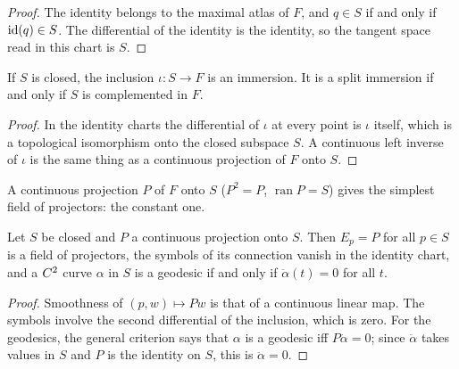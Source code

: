 \begin{proof}
  \leanok
  The identity belongs to the maximal atlas of $F$, and $q \in S$ if and only if
  $\mathrm{id}(q) \in S$. The differential of the identity is the identity, so the tangent space read
  in this chart is $S$.
\end{proof}

\begin{proposition}
  \label{prop:ex-subspace-immersion}
  \leanok
  If $S$ is closed, the inclusion $\iota \colon S \to F$ is an immersion. It is a split
  immersion if and only if $S$ is complemented in $F$.
\end{proposition}

\begin{proof}
  \leanok
  In the identity charts the differential of $\iota$ at every point is $\iota$ itself, which is
  a topological isomorphism onto the closed subspace $S$. A continuous left inverse of $\iota$
  is the same thing as a continuous projection of $F$ onto $S$.
\end{proof}

A continuous projection $P$ of $F$ onto $S$ ($P^2 = P$, $\operatorname{ran} P = S$) gives the
simplest field of projectors: the constant one.

\begin{proposition}
  \label{prop:ex-subspace-flat}
  \leanok
  Let $S$ be closed and $P$ a continuous projection onto $S$. Then $E_p = P$ for all $p \in S$
  is a field of projectors, the symbols of its connection vanish in the identity chart, and a
  $C^{2}$ curve $\alpha$ in $S$ is a geodesic if and only if $\ddot\alpha(t) = 0$ for all $t$.
\end{proposition}

\begin{proof}
  \leanok
  Smoothness of $(p, w) \mapsto P w$ is that of a continuous linear map. The symbols involve the
  second differential of the inclusion, which is zero. For the geodesics, the general criterion
  says that $\alpha$ is a geodesic iff $P\ddot\alpha = 0$; since $\ddot\alpha$ takes values in
  $S$ and $P$ is the identity on $S$, this is $\ddot\alpha = 0$.
\end{proof}


